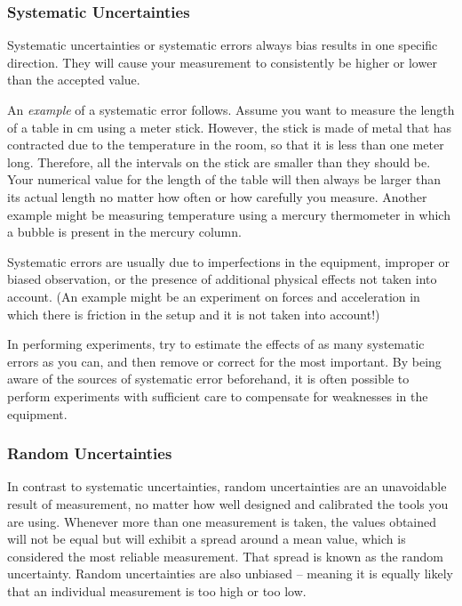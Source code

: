 \documentclass{article}
\begin{document}
\subsubsection{Systematic Uncertainties}

Systematic uncertainties or systematic errors always bias results in one specific direction. They will cause your measurement to consistently be higher or lower than the accepted value. \myskip

An \emph{example} of a systematic error follows. Assume you want to measure the length of a table in cm using a meter stick. However, the stick is made of metal that has contracted due to the temperature in the room, so that it is less than one meter long. Therefore, all the intervals on the stick are smaller than they should be. Your numerical value for the length of the table will then always be larger than its actual length no matter how often or how carefully you measure. Another example might be measuring temperature using a mercury thermometer in which a bubble is present in the mercury column. \myskip

Systematic errors are usually due to imperfections in the equipment, improper or biased observation, or the presence of additional physical effects not taken into account. (An example might be an experiment on forces and acceleration in which there is friction in the setup and it is not taken into account!) \myskip

In performing experiments, try to estimate the effects of as many systematic errors as you can, and then remove or correct for the most important. By being aware of the sources of systematic error beforehand, it is often possible to perform experiments with sufficient care to compensate for weaknesses in the equipment.

\subsubsection{Random Uncertainties}

In contrast to systematic uncertainties, random uncertainties are an unavoidable result of measurement, no matter how well designed and calibrated the tools you are using. Whenever more than one measurement is taken, the values obtained will not be equal but will exhibit a spread around a mean value, which is considered the most reliable measurement. That spread is known as the random uncertainty. Random uncertainties are also unbiased -- meaning it is equally likely that an individual measurement is too high or too low. \myskip
\end{document}

